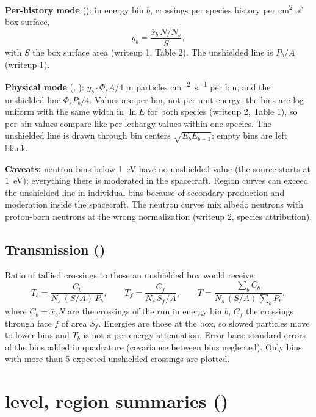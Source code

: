 \textbf{Per-history mode} (): in energy bin $b$, crossings per species history per \si{cm^2} of box surface,
\begin{equation}
  y_b = \frac{\bar x_b\,N/N_s}{S},
\end{equation}
with $S$ the box surface area (writeup 1, Table 2). The unshielded line is $P_b/A$ (writeup 1).

\textbf{Physical mode} (, ): $y_b\cdot\Phi_sA/4$ in particles \si{cm^{-2}.s^{-1}} per bin, and the unshielded line $\Phi_sP_b/4$. Values are per bin, not per unit energy; the bins are log-uniform with the same width in $\ln E$ for both species (writeup 2, Table 1), so per-bin values compare like per-lethargy values within one species. The unshielded line is drawn through bin centers $\sqrt{E_bE_{b+1}}$; empty bins are left blank.

\textbf{Caveats:} neutron bins below \SI{1}{eV} have no unshielded value (the source starts at \SI{1}{eV}); everything there is moderated in the spacecraft. Region curves can exceed the unshielded line in individual bins because of secondary production and moderation inside the spacecraft. The neutron curves mix albedo neutrons with proton-born neutrons at the wrong normalization (writeup 2, species attribution).

\subsection{Transmission ()}
Ratio of tallied crossings to those an unshielded box would receive:
\begin{equation}
  T_b = \frac{C_b}{N_s\,(S/A)\,P_b},\qquad
  T_f = \frac{C_f}{N_s\,S_f/A},\qquad
  T = \frac{\sum_b C_b}{N_s\,(S/A)\,\sum_b P_b},
\end{equation}
where $C_b=\bar x_bN$ are the crossings of the run in energy bin $b$, $C_f$ the crossings through face $f$ of area $S_f$. Energies are those at the box, so slowed particles move to lower bins and $T_b$ is not a per-energy attenuation. Error bars: \mcdc{} standard errors of the bins added in quadrature (covariance between bins neglected). Only bins with more than 5 expected unshielded crossings are plotted.

\section{\gfour{} level, region summaries ()}

